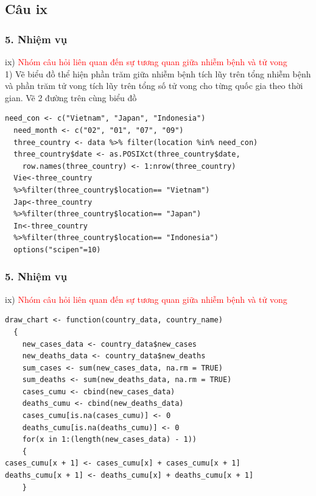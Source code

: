 \documentclass[english,10pt,table]{beamer}
\begin{document}
\subsection{Câu ix}
\begin{frame}[fragile]
\frametitle{5.  Nhiệm vụ}
ix) \textcolor{red}{Nhóm câu hỏi liên quan đến sự tương quan giữa nhiễm bệnh và tử vong}\\
        1) Vẽ biểu đồ thể hiện phần trăm giữa nhiễm bệnh tích lũy trên tổng nhiễm bệnh và phần trăm tử vong tích lũy trên tổng số tử vong cho từng quốc gia theo thời gian. Vẽ 2 đường trên cùng biểu đồ\\
\begin{lstlisting}[frame = single,basicstyle=\tiny]
  need_con <- c("Vietnam", "Japan", "Indonesia")
  need_month <- c("02", "01", "07", "09")
  three_country <- data %>% filter(location %in% need_con)
  three_country$date <- as.POSIXct(three_country$date, 
    row.names(three_country) <- 1:nrow(three_country)
  Vie<-three_country
  %>%filter(three_country$location== "Vietnam")
  Jap<-three_country
  %>%filter(three_country$location== "Japan")
  In<-three_country
  %>%filter(three_country$location== "Indonesia")
  options("scipen"=10)
        \end{lstlisting}
\end{frame}

\begin{frame}[fragile]
\frametitle{5.  Nhiệm vụ}
ix) \textcolor{red}{Nhóm câu hỏi liên quan đến sự tương quan giữa nhiễm bệnh và tử vong}\\
    \begin{lstlisting}[frame = single,basicstyle=\tiny]
  draw_chart <- function(country_data, country_name)
  {
    new_cases_data <- country_data$new_cases
    new_deaths_data <- country_data$new_deaths
    sum_cases <- sum(new_cases_data, na.rm = TRUE)
    sum_deaths <- sum(new_deaths_data, na.rm = TRUE)
    cases_cumu <- cbind(new_cases_data)
    deaths_cumu <- cbind(new_deaths_data)
    cases_cumu[is.na(cases_cumu)] <- 0
    deaths_cumu[is.na(deaths_cumu)] <- 0
    for(x in 1:(length(new_cases_data) - 1))
    {
cases_cumu[x + 1] <- cases_cumu[x] + cases_cumu[x + 1]
deaths_cumu[x + 1] <- deaths_cumu[x] + deaths_cumu[x + 1]
    }
        \end{lstlisting}
\end{frame}
\end{document}

